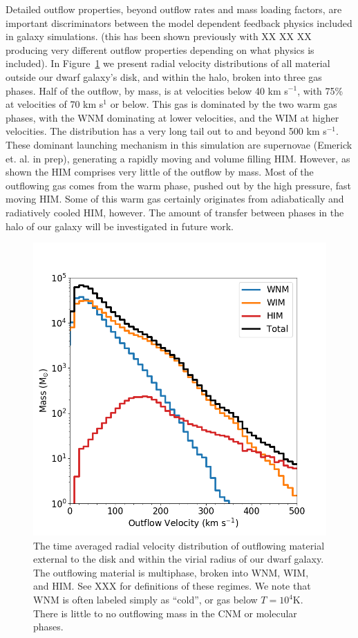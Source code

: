 \documentclass[twocolumn]{aastex61}
\begin{document}
Detailed outflow properties, beyond outflow rates and mass loading factors, are important discriminators between the model dependent feedback physics included in galaxy simulations. (this has been shown previously with XX XX XX producing very different outflow properties depending on what physics is included). In Figure~\ref{fig:outflow_velocity} we present radial velocity distributions of all material outside our dwarf galaxy's disk, and within the halo, broken into three gas phases. Half of the outflow, by mass, is at velocities below 40 km s$^{-1}$, with 75\% at velocities of 70 km s$^{1}$ or below. This gas is dominated by the two warm gas phases, with the WNM dominating at lower velocities, and the WIM at higher velocities. The distribution has a very long tail out to and beyond 500 km s$^{-1}$. These dominant launching mechanism in this simulation are supernovae (Emerick et. al. in prep), generating a rapidly moving and volume filling HIM. However, as shown the HIM comprises very little of the outflow by mass. Most of the outflowing gas comes from the warm phase, pushed out by the high pressure, fast moving HIM. Some of this warm gas certainly originates from adiabatically and radiatively cooled HIM, however. The amount of transfer between phases in the halo of our galaxy will be investigated in future work.

\begin{figure}
\centering
\includegraphics[width=0.95\linewidth]{outflow_velocity_distribution}
\caption{The time averaged radial velocity distribution of outflowing material external to the disk and within the virial radius of our dwarf galaxy. The outflowing material is multiphase, broken into WNM, WIM, and HIM. See XXX for definitions of these regimes. We note that WNM is often labeled simply as ``cold'', or gas below $T = 10^{4}$K. There is little to no outflowing mass in the CNM or molecular phases.}
\label{fig:outflow_velocity}
\end{figure}
\end{document}
